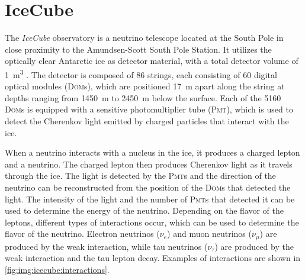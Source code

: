 \section{IceCube}
The \emph{IceCube} observatory is a neutrino telescope located at the South Pole
in close proximity to the Amundsen-Scott South Pole Station.
It utilizes the optically clear Antarctic ice as detector material,
  with a total detector volume of \SI{1}{\cubic\meter} \cite{icecube_facts}.
The detector is composed of \num{86} strings,
  each consisting of \num{60} digital optical modules (\textsc{Dom}s),
    which are positioned
      \SI{17}{\meter} apart along the string
      at depths ranging from \SI{1450}{\meter} to \SI{2450}{\meter} below the surface.
Each of the \num{5160} \textsc{Dom}s is equipped with a sensitive photomultiplier tube (\textsc{Pmt}),
  which is used to detect the Cherenkov light emitted by charged particles
  that interact with the ice.



When a neutrino interacts with a nucleus in the ice,
it produces a charged lepton and a neutrino.
The charged lepton then produces Cherenkov light
  as it travels through the ice.
The light is detected by the \textsc{Pmt}s
  and the direction of the neutrino can be reconstructed
  from the position of the \textsc{Dom}s that detected the light.
The intensity of the light and the number of \textsc{Pmt}s that detected it
  can be used to determine the energy of the neutrino.
Depending on the flavor of the leptons,
  different types of interactions occur,
  which can be used to determine the flavor of the neutrino.
Electron neutrinos ($\nu_e$) and muon neutrinos ($\nu_\mu$) are produced by the weak interaction,
  while tau neutrinos ($\nu_\tau$) are produced by the weak interaction
  and the tau lepton decay.
Examples of interactions are shown in \autoref{fig:img:icecube:interactions}.



